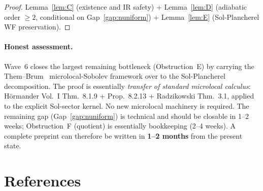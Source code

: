 \documentclass[11pt,a4paper]{article}
\theoremstyle{definition}
\begin{document}
\begin{proof}
Lemma~\ref{lem:C} (existence and IR safety) + Lemma~\ref{lem:D}
(adiabatic order $\geq 2$, conditional on Gap~\ref{gap:nuniform}) +
Lemma~\ref{lem:E} (Sol-Plancherel WF preservation).
\end{proof}

\paragraph{Honest assessment.}
Wave~6 closes the largest remaining bottleneck (Obstruction~E) by carrying
the Them--Brum~\cite{TB13} microlocal-Sobolev framework over to the
Sol-Plancherel decomposition.  The proof is essentially \emph{transfer of
standard microlocal calculus}: H\"ormander Vol.~I Thm.~8.1.9 + Prop.~8.2.13
+ Radzikowski Thm.~3.1, applied to the explicit Sol-sector kernel.  No new
microlocal machinery is required.  The remaining gap (Gap~\ref{gap:nuniform})
is technical and should be closable in 1--2 weeks; Obstruction~F (quotient)
is essentially bookkeeping (2--4 weeks).  A complete preprint can therefore
be written in \textbf{1--2 months} from the present state.

\section*{References}
\end{document}
